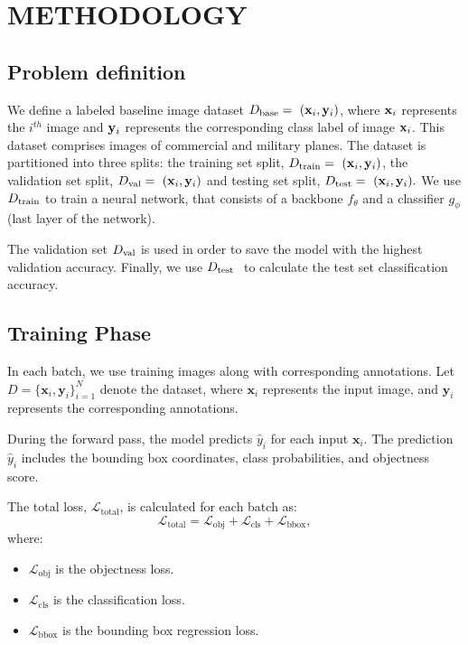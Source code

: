 \section{\uppercase{Methodology}}
\label{sec:methodology}
\subsection{Problem definition}
We define a labeled baseline image dataset $ D_{\mathrm{base}} =\ (\mathbf{x}_i,\mathbf{y}_i)$, where $\mathbf{x}_i $ represents the $i^{th}$  image and $\mathbf{y}_i$ represents the corresponding class label of image $\mathbf{x}_i $. This dataset comprises images of commercial and military planes. The dataset is partitioned into three splits: the training set split, ${D_{\train}=\ ({\vx}_i,\vy_i})$, the validation set split,  $ {D_{\mathrm{val}}=\ ({\mathbf{x}}_i,\mathbf{y}_i})$ and testing set split, ${D_{\test}=\ ({\vx}_i,\vy_i}).$ We use $D_{\mathrm{train}}$ to train a neural network, that consists of a backbone $f_{\theta}$ and a classifier $g_{\phi}$ (last layer of the network). 

The validation set $D_{\mathrm{val}}$ is used in order to save the model with the highest validation accuracy. Finally, we use $D_{\mathrm{test}}\ $ to calculate the test set classification accuracy. 

\subsection{Training Phase}
In each batch, we use training images along with corresponding annotations. Let $D = \{\mathbf{x}_i, \mathbf{y}_i\}_{i=1}^N$ denote the dataset, where $\mathbf{x}_i$ represents the input image, and $\mathbf{y}_i$ represents the corresponding annotations.

During the forward pass, the model predicts $\hat{y}_i$ for each input $\mathbf{x}_i$. The prediction $\hat{y}_i$ includes the bounding box coordinates, class probabilities, and objectness score. 

The total loss, $\mathcal{L}_\text{total}$, is calculated for each batch as:
\begin{equation}
    \mathcal{L}_\text{total} = \mathcal{L}_\text{obj} + \mathcal{L}_\text{cls} + \mathcal{L}_\text{bbox},
\end{equation}
where:
\begin{itemize}
    \item $\mathcal{L}_\text{obj}$ is the objectness loss.
    \item $\mathcal{L}_\text{cls}$ is the classification loss.
    \item $\mathcal{L}_\text{bbox}$ is the bounding box regression loss.
\end{itemize}

